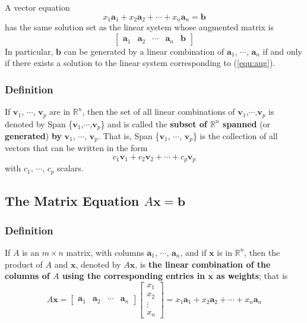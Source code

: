 \documentclass[letterpaper,11pt]{article}
\begin{document}
			A vector equation
			\begin{equation}
				x_1\mathbf{a}_1+x_2\mathbf{a}_2+\cdots+x_n\mathbf{a}_n=\mathbf{b}
			\end{equation}
			has the same solution set as the linear system whose augmented matrix is
			\begin{equation}
				\label{equ:aug}
				\begin{bmatrix}
					\mathbf{a}_1 & \mathbf{a}_2 & \cdots & \mathbf{a}_n & \mathbf{b}
				\end{bmatrix}
			\end{equation}
			In particular, $\mathbf{b}$ can be generated by a linear combination of $\mathbf{a}_1$, $\cdots$, $\mathbf{a}_n$ if and only if there exists a solution to the linear system corresponding to (\ref{equ:aug}).
			
			\subsubsection{Definition}
				If $\mathbf{v}_1$, $\cdots$, $\mathbf{v}_p$ are in $\mathbb{R}^n$, then the set of all linear combinations of $\mathbf{v}_1$,$\cdots$,$\mathbf{v}_p$ is denoted by Span \{$\mathbf{v}_1$,$\cdots$,$\mathbf{v}_p$\} and is called the \textbf{subset of $\mathbb{R}^n$ spanned} (or \textbf{generated}) \textbf{by}  $\mathbf{v}_1$, $\cdots$, $\mathbf{v}_p$. That is, Span \{$\mathbf{v}_1$, $\cdots$, $\mathbf{v}_p$\} is the collection of all vectors that can be written in the form
				\begin{equation}
					c_1\mathbf{v}_1+c_2\mathbf{v}_2+\cdots+c_p\mathbf{v}_p
				\end{equation}
				with $c_1$, $\cdots$, $c_p$ scalars.
		\subsection{The Matrix Equation $A\mathbf{x}=\mathbf{b}$}
			\subsubsection{Definition}
				If $A$ is an $m\times n$ matrix, with columns $\mathbf{a}_1$, $\cdots$, $\mathbf{a}_n$, and if $\mathbf{x}$ is in $\mathbb{R}^n$, then the product of $A$ and $\mathbf{x}$, denoted by $A\mathbf{x}$, is \textbf{the linear combination of the columns of $A$ using the corresponding entries in $\mathbf{x}$ as weights}; that is
				\begin{equation}
					A\mathbf{x}=
					\begin{bmatrix}
						\mathbf{a}_1 & \mathbf{a}_2 & \cdots & \mathbf{a}_n
					\end{bmatrix}
					\begin{bmatrix}
						x_1 \\ x_2 \\ \vdots \\ x_n
					\end{bmatrix}
					=x_1\mathbf{a}_1+x_2\mathbf{a}_2+\cdots+x_n\mathbf{a}_n
				\end{equation}
\end{document}
